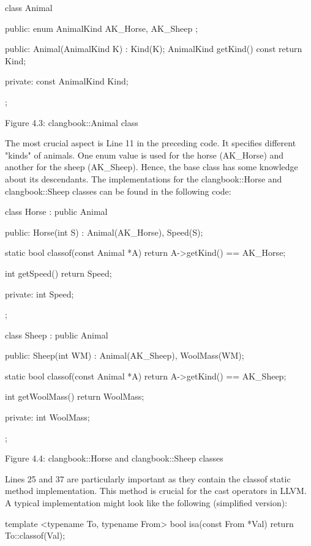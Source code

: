 \begin{cpp}
class Animal {
public:
  enum AnimalKind { AK_Horse, AK_Sheep };

public:
  Animal(AnimalKind K) : Kind(K){};
  AnimalKind getKind() const { return Kind; }

private:
  const AnimalKind Kind;
};
\end{cpp}

\begin{center}
Figure 4.3: clangbook::Animal class
\end{center}

The most crucial aspect is Line 11 in the preceding code. It specifies different "kinds" of animals. One enum value is used for the horse (AK\_Horse) and another for the sheep (AK\_Sheep). Hence, the base class has some knowledge about its descendants. The implementations for the clangbook::Horse and clangbook::Sheep classes can be found in the following code:

\begin{cpp}
class Horse : public Animal {
public:
  Horse(int S) : Animal(AK_Horse), Speed(S){};

  static bool classof(const Animal *A) { return A->getKind() == AK_Horse; }

  int getSpeed() { return Speed; }

private:
  int Speed;
};

class Sheep : public Animal {
public:
  Sheep(int WM) : Animal(AK_Sheep), WoolMass(WM){};

  static bool classof(const Animal *A) { return A->getKind() == AK_Sheep; }

  int getWoolMass() { return WoolMass; }

private:
  int WoolMass;
};
\end{cpp}

\begin{center}
Figure 4.4: clangbook::Horse and clangbook::Sheep classes
\end{center}

Lines 25 and 37 are particularly important as they contain the classof static method implementation. This method is crucial for the cast operators in LLVM. A typical implementation might look like the following (simplified version):

\begin{cpp}
template <typename To, typename From>
bool isa(const From *Val) {
  return To::classof(Val);
}
\end{cpp}


